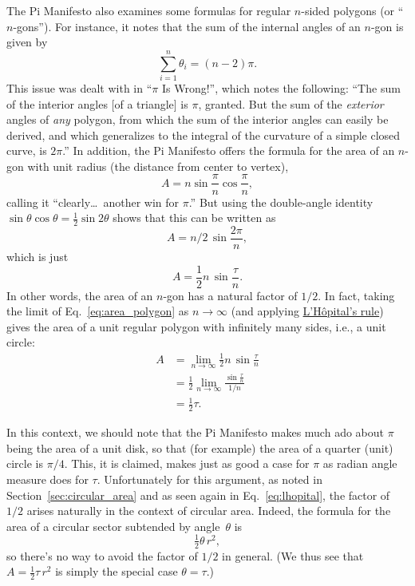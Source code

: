 The Pi Manifesto also examines some formulas for regular
$n$-sided polygons (or ``$n$-gons''). For instance, it notes that the sum of the internal angles of an $n$-gon is given by
\[
\sum_{i=1}^n \theta_i=(n-2)\pi.
\]
This issue was dealt with in ``$\pi$ Is Wrong!'', which notes the following: ``The sum of the interior angles [of a
triangle] is $\pi$, granted. But the sum of the \emph{exterior} angles of \emph{any}
polygon, from which the sum of the interior angles can easily be
derived, and which generalizes to the integral of the curvature of a
simple closed curve, is $2\pi$.'' In addition, the Pi Manifesto offers the formula for the area of an $n$-gon with unit radius (the distance from center to vertex),
\[ A=n\sin\frac{\pi}{n}\cos\frac{\pi}{n}, \]
calling it ``clearly\ldots\ another win for $\pi$.'' But using the double-angle identity $\sin\theta\cos\theta = \frac{1}{2} \sin 2\theta$ shows that this can be written as
\[ A = n/2\, \sin\frac{2\pi}{n}, \]
which is just
\begin{equation}
\label{eq:area_polygon}
A = \frac{1}{2} n\, \sin\frac{\tau}{n}.
\end{equation}
In other words, the area of an $n$-gon has a natural
factor of $1/2$. In fact, taking the limit of Eq.~\eqref{eq:area_polygon} as $n\rightarrow \infty$ (and applying \href{https://mathworld.wolfram.com/LHospitalsRule.html}{L'H\^{o}pital's rule}) gives the area of a unit regular polygon with infinitely many sides, i.e., a unit circle:
\begin{equation}
\label{eq:lhopital}
\begin{split}
A & = \lim_{n\rightarrow\infty} \frac{1}{2} n\, \sin\frac{\tau}{n} \\
  & = \frac{1}{2} \lim_{n\rightarrow\infty} \frac{\sin\frac{\tau}{n}}{1/n} \\
  & = \tfrac{1}{2}\tau.
\end{split}
\end{equation}

In this context, we should note that the Pi Manifesto makes much ado about $\pi$ being the area of a unit disk, so that (for example) the area of a quarter (unit) circle is $\pi/4$. This, it is claimed, makes just as good a case for $\pi$ as radian angle measure does for $\tau$. Unfortunately for this argument, as noted in Section~\ref{sec:circular_area} and as seen again in Eq.~\eqref{eq:lhopital}, the factor of $1/2$ arises naturally in the context of circular area. Indeed, the formula for the area of a circular sector subtended by angle~$\theta$ is
\[
\tfrac{1}{2}\theta\, r^2,
\]
so there's no way to avoid the factor of $1/2$ in general. (We thus see that $A =
\frac{1}{2} \tau\, r^2$ is simply the special case $\theta = \tau$.)

